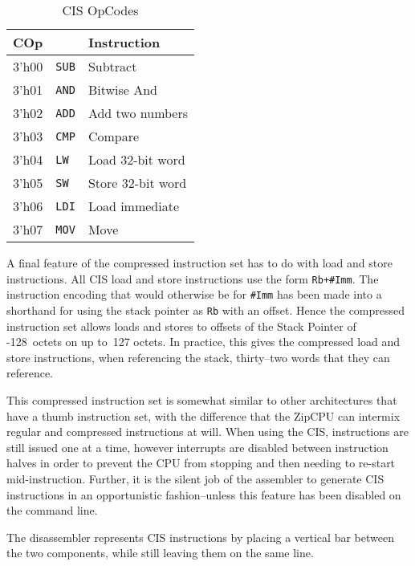 \documentclass{gqtekspec}
\begin{document}
\begin{table}\begin{center}
\begin{tabular}{|l|l|l|} \hline \rowcolor[gray]{0.85}
COp & & Instruction \\\hline\hline
3'h00 & {\tt SUB} & Subtract   \\\hline
3'h01 & {\tt AND} & Bitwise And   \\\hline
3'h02 & {\tt ADD} & Add two numbers   \\\hline
3'h03 & {\tt CMP}  & Compare \\\hline
3'h04 & {\tt LW} & Load 32-bit word\\\hline
3'h05 & {\tt SW} & Store 32-bit word\\\hline
3'h06 & {\tt LDI} & Load immediate\\\hline
3'h07 & {\tt MOV} & Move\\\hline
\end{tabular}
\caption{CIS OpCodes}\label{tbl:iset-cisops}
\end{center}\end{table}

A final feature of the compressed instruction set has to do with load and
store instructions.  All CIS load and store instructions use the form
{\tt Rb+\#Imm}.  The instruction encoding that would otherwise be for
{\tt \#Imm} has been made into a shorthand for using the stack pointer as
{\tt Rb} with an offset.  Hence the compressed instruction set allows loads and
stores to offsets of the Stack Pointer of -128~octets on up to~127 octets.  In
practice, this gives the compressed load and store instructions, when
referencing the stack, thirty--two words that they can reference.

This compressed instruction set is somewhat similar to other architectures that
have a thumb instruction set, with the difference that the ZipCPU can intermix
regular and compressed instructions at will.  When using the CIS, instructions
are still issued one at a time, however interrupts are disabled between
instruction halves in order to prevent the CPU from stopping and then needing
to re-start mid-instruction.  Further, it is the silent job of the assembler
to generate CIS instructions in an opportunistic fashion--unless this feature
has been disabled on the command line.

The disassembler represents CIS instructions by placing a vertical bar
between the two components, while still leaving them on the same line.
\end{document}
